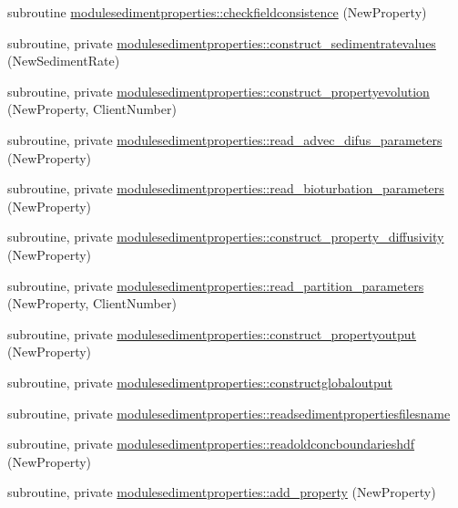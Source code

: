\begin{DoxyCompactItemize}
\item 
subroutine \mbox{\hyperlink{namespacemodulesedimentproperties_aed9da5330d31cd4f61d7b60492c4d0ad}{modulesedimentproperties\+::checkfieldconsistence}} (New\+Property)
\item 
subroutine, private \mbox{\hyperlink{namespacemodulesedimentproperties_a6a52cd2ecac4c72aa40426e7ed1e0616}{modulesedimentproperties\+::construct\+\_\+sedimentratevalues}} (New\+Sediment\+Rate)
\item 
subroutine, private \mbox{\hyperlink{namespacemodulesedimentproperties_a0062c792fb1ce4d0c7dbe3c701104971}{modulesedimentproperties\+::construct\+\_\+propertyevolution}} (New\+Property, Client\+Number)
\item 
subroutine, private \mbox{\hyperlink{namespacemodulesedimentproperties_ae4b16a3890a8718b83545926394da139}{modulesedimentproperties\+::read\+\_\+advec\+\_\+difus\+\_\+parameters}} (New\+Property)
\item 
subroutine, private \mbox{\hyperlink{namespacemodulesedimentproperties_aa74dbe9c3eb52147100981fe4f5d8702}{modulesedimentproperties\+::read\+\_\+bioturbation\+\_\+parameters}} (New\+Property)
\item 
subroutine, private \mbox{\hyperlink{namespacemodulesedimentproperties_ad39d979b59e5b787373491b93c07fbf0}{modulesedimentproperties\+::construct\+\_\+property\+\_\+diffusivity}} (New\+Property)
\item 
subroutine, private \mbox{\hyperlink{namespacemodulesedimentproperties_afa4c90b28af961558ea18ba6ed05123b}{modulesedimentproperties\+::read\+\_\+partition\+\_\+parameters}} (New\+Property, Client\+Number)
\item 
subroutine, private \mbox{\hyperlink{namespacemodulesedimentproperties_ae799f87453bb5cd4088f0289710bf961}{modulesedimentproperties\+::construct\+\_\+propertyoutput}} (New\+Property)
\item 
subroutine, private \mbox{\hyperlink{namespacemodulesedimentproperties_a003638c1656ce528c586d7f167d3d025}{modulesedimentproperties\+::constructglobaloutput}}
\item 
subroutine, private \mbox{\hyperlink{namespacemodulesedimentproperties_a75f3289f9063b5325117a4d39bebace2}{modulesedimentproperties\+::readsedimentpropertiesfilesname}}
\item 
subroutine, private \mbox{\hyperlink{namespacemodulesedimentproperties_a5eab479d8cef7089906fb647d918b3fe}{modulesedimentproperties\+::readoldconcboundarieshdf}} (New\+Property)
\item 
subroutine, private \mbox{\hyperlink{namespacemodulesedimentproperties_a6c62c3f418883d0d880c6158695566b6}{modulesedimentproperties\+::add\+\_\+property}} (New\+Property)

\end{DoxyCompactItemize}
